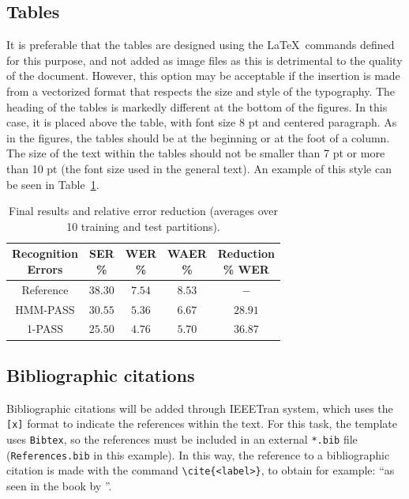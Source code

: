 \documentclass[eng]{ajceam-class}
\begin{document}
\subsection{Tables}

It is preferable that the tables are designed using the \LaTeX\ commands defined for this purpose, and not added as image files as this is detrimental to the quality of the document. However, this option may be acceptable if the insertion is made from a vectorized format that respects the size and style of the typography. The heading of the tables is markedly different at the bottom of the figures. In this case, it is placed above the table, with font size 8 pt and centered paragraph. As in the figures, the tables should be at the beginning or at the foot of a column. The size of the text within the tables should not be smaller than 7 pt or more than 10 pt (the font size used in the general text). An example of this style can be seen in Table~\ref{table-1}.

\begin{table}[!b]
 \centering
  \caption{Final results and relative error reduction (averages over 10 training and test partitions).} \label{table-1}
 {\small
 \begin{tabular}{ccccc}
  \hline
  \hline
  \thead{Recognition \\ Errors} & \thead{SER \\ \%} & \thead{WER \\ \%} & \thead{WAER \\ \%} &
                        \thead{Reduction \\ \% WER} \\
  \hline
  \hline
  Reference & $38.30$ & $7.54$ & $8.53$ & $-$ \\
  \hline
  HMM-PASS & $30.55$ & $5.36$ & $6.67$ & $28.91$ \\
  1-PASS & $25.50$ & $4.76$ & $5.70$ & $36.87$   \\
  \hline
  \hline
 \end{tabular}}
\end{table}

\subsection{Bibliographic citations}

Bibliographic citations will be added through IEEETran system, which uses the \texttt{[x]} format to indicate the references within the text. For this task, the template uses \texttt{Bibtex}, so the references must be included in an external \texttt{*.bib} file (\texttt{References.bib} in this example). In this way, the reference to a bibliographic citation is made with the command \verb!\cite{<label>}!, to obtain for example: ``as seen in the book by \cite{Mitchell2001}''.
\end{document}
